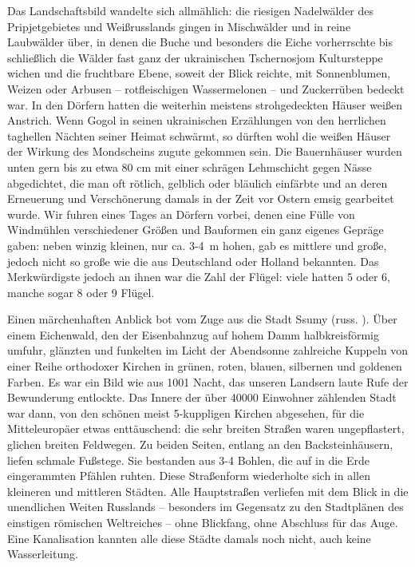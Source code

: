 Das Landschaftsbild wandelte sich allmählich: die riesigen Nadelwälder des Pripjetgebietes und Weißrusslands gingen in Mischwälder und in reine Laubwälder über, in denen die Buche und besonders die Eiche vorherrschte bis schließlich die Wälder fast ganz der ukrainischen Tschernosjom Kultursteppe wichen und die fruchtbare Ebene, soweit der Blick reichte, mit Sonnenblumen, Weizen oder Arbusen -- rotfleischigen Wassermelonen -- und Zuckerrüben bedeckt war. In den Dörfern hatten die weiterhin meistens strohgedeckten Häuser weißen Anstrich. Wenn Gogol in seinen ukrainischen Erzählungen von den herrlichen taghellen Nächten seiner Heimat schwärmt, so dürften wohl die weißen Häuser der Wirkung des Mondscheins zugute gekommen sein. Die Bauernhäuser wurden unten gern bis zu etwa 80 cm mit einer schrägen Lehmschicht gegen Nässe abgedichtet, die man oft rötlich, gelblich oder bläulich einfärbte und an deren Erneuerung und Verschönerung damals in der Zeit vor Ostern emsig gearbeitet wurde. Wir fuhren eines Tages an Dörfern vorbei, denen eine Fülle von Windmühlen verschiedener Größen und Bauformen ein ganz eigenes Gepräge gaben: neben winzig kleinen, nur ca. 3-4~m hohen, gab es mittlere und große, jedoch nicht so große wie die aus Deutschland oder Holland bekannten. Das Merkwürdigste jedoch an ihnen war die Zahl der Flügel: viele hatten 5 oder 6, manche sogar 8 oder 9 Flügel.

Einen märchenhaften Anblick bot vom Zuge aus die Stadt Ssumy (russ. ). Über einem Eichenwald, den der Eisenbahnzug auf hohem Damm halbkreisförmig umfuhr, glänzten und funkelten im Licht der Abendsonne zahlreiche Kuppeln von einer Reihe orthodoxer Kirchen in grünen, roten, blauen, silbernen und goldenen Farben. Es war ein Bild wie aus 1001 Nacht, das unseren Landsern laute Rufe der Bewunderung entlockte. Das Innere der über \num{40000} Einwohner zählenden Stadt war dann, von den schönen meist 5-kuppligen Kirchen abgesehen, für die Mitteleuropäer etwas enttäuschend: die sehr breiten Straßen waren ungepflastert, glichen breiten Feldwegen. Zu beiden Seiten, entlang an den Backsteinhäusern, liefen schmale Fußstege. Sie bestanden aus 3-4 Bohlen, die auf in die Erde eingerammten Pfählen ruhten. Diese Straßenform wiederholte sich in allen kleineren und mittleren Städten. Alle Hauptstraßen verliefen mit dem Blick in die unendlichen Weiten Russlands -- besonders im Gegensatz zu den Stadtplänen des einstigen römischen Weltreiches -- ohne Blickfang, ohne Abschluss für das Auge. Eine Kanalisation kannten alle diese Städte damals noch nicht, auch keine Wasserleitung.

